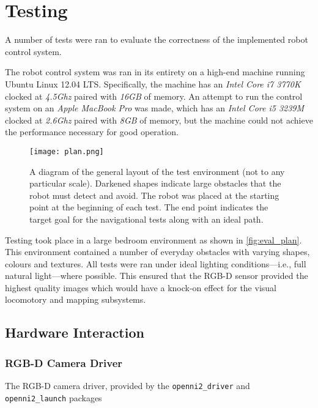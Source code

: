 \chapter{Testing}
\label{chap:evaluation}


A number of tests were ran to evaluate the correctness of the implemented robot control system. 

The robot control system was ran in its entirety on a high-end machine running Ubuntu Linux 12.04 LTS. Specifically, the machine has an \emph{Intel Core i7 3770K} clocked at \emph{4.5Ghz} paired with \emph{16GB} of memory. An attempt to run the control system on an \emph{Apple MacBook Pro} was made, which has an \emph{Intel Core i5 3239M} clocked at \emph{2.6Ghz} paired with \emph{8GB} of memory, but the machine could not achieve the performance necessary for good operation.

\begin{figure}[!h]
	\centering
	\texttt{[image: plan.png]}
	\caption{A diagram of the general layout of the test environment (not to any particular scale). Darkened shapes indicate large obstacles that the robot must detect and avoid. The robot was placed at the starting point at the beginning of each test. The end point indicates the target goal for the navigational tests along with an ideal path.}
	\label{fig:eval_plan}
\end{figure}

Testing took place in a large bedroom environment as shown in \autoref{fig:eval_plan}. This environment contained a number of everyday obstacles with varying shapes, colours and textures. All tests were ran under ideal lighting conditions---i.e., full natural light---where possible. This ensured that the RGB-D sensor provided the highest quality images which would have a knock-on effect for the visual locomotory and mapping subsystems.

\section{Hardware Interaction}

\subsection{RGB-D Camera Driver}

The RGB-D camera driver, provided by the \texttt{openni2\_driver} and \texttt{openni2\_launch} packages

